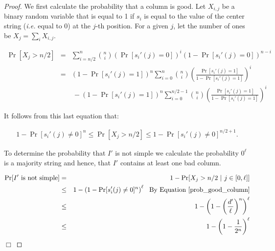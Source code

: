\begin{proof} We first calculate the probability that a column is good.  Let $X_{i, j}$ be a binary random variable that is equal to 1 if $s_i$ is equal to the value of the center string ({\em i.e.} equal to $0$) at the $j$-th position.  For a given $j$, let the number of ones be $X_j = \sum_{i} X_{i,j}$.  

\begin{eqnarray*}
\Pr[X_j > n/2] 	& = & \sum_{i = n/2}^n {n \choose i} \left(\Pr[s_i'(j) = 0]\right)^i \left(1 - \Pr[s_i'(j) = 0] \right)^{n - i} \\ 
						& = &(1 - \Pr[s_i'(j) = 1])^n  \sum_{i = 0}^n {n \choose i} \left(\frac{\Pr[s_i'(j) = 1]}{1 - \Pr[s_i'(j) = 1]} \right)^i  \\
						&~&~ - (1 - \Pr[s_i'(j) = 1])^n \sum_{i = 0}^{n/2 - 1} {n \choose i} \left(\frac{\Pr[s_i'(j) = 1]}{1 - \Pr[s_i'(j) = 1]} \right)^i 
\end{eqnarray*} 

It follows from this last equation that: 

\begin{eqnarray}\label{prob_good_column}
1  - \Pr[s_i'(j) \ne 0]^n	\leq  \Pr[X_j > n/2] 	 \leq 1  - \Pr[s_i'(j) \ne 0]^{n/2 + 1}. 
\end{eqnarray} 


To determine the probability that $I'$ is not simple we calculate the probability $0^{\ell}$ is a majority string and hence, that $I'$ contains at least one bad column.   

\begin{eqnarray*}
\Pr[I' \mbox{ is not simple}] 	& = & 1 - \Pr [X_j > n/2 \, \, |  \, \, j \in [0, \ell] ] \\ 
												& \leq & 1 -  \left( 1 - \Pr[s_i'(j) \ne 0]^n \right)^{\ell} \, \, \mbox{ By Equation \ref{prob_good_column}} \\
												& \leq & 1 - \left( 1  - \left(\frac{d'}{\ell}\right)^n\right)^{\ell} \\ 
												& \leq & 1 - \left( 1  - \frac{1}{2^n}\right)^{\ell}
\end{eqnarray*} \hfill  $\Box$ \end{proof}


